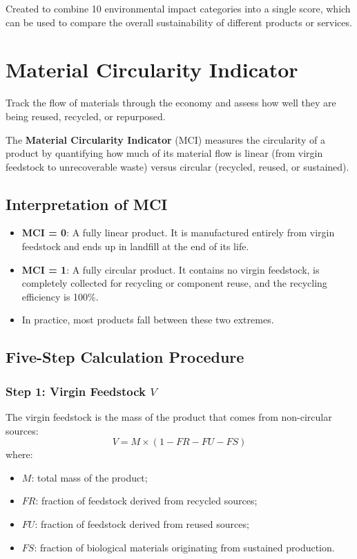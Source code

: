 \documentclass{NoteThesis/note-thesis}
\begin{document}
\begin{mynote_env}[frametitle={Okala Impact Factor}]
    Created to combine 10 environmental impact categories into a single score, which can be used to compare the overall sustainability of different products or services.
\end{mynote_env}

\section{Material Circularity Indicator}

Track the flow of materials through the economy and assess how well they are being reused, recycled, or repurposed.

The \textbf{Material Circularity Indicator} (MCI) measures the circularity of a product by quantifying how much of its material flow is linear (from virgin feedstock to unrecoverable waste) versus circular (recycled, reused, or sustained).

\subsection{Interpretation of MCI}

\begin{itemize}
    \item \textbf{MCI = 0}: A fully linear product.
    It is manufactured entirely from virgin feedstock and ends up in landfill at the end of its life.
    \item \textbf{MCI = 1}: A fully circular product.
    It contains no virgin feedstock, is completely collected for recycling or component reuse, and the recycling efficiency is 100\%.
    \item In practice, most products fall between these two extremes.
\end{itemize}

\subsection{Five-Step Calculation Procedure}

\subsubsection{Step 1: Virgin Feedstock $V$}

The virgin feedstock is the mass of the product that comes from non-circular sources:
\[
    V = M \times (1 - FR - FU - FS)
\]
where:
\begin{itemize}
    \item $M$: total mass of the product;
    \item $FR$: fraction of feedstock derived from recycled sources;
    \item $FU$: fraction of feedstock derived from reused sources;
    \item $FS$: fraction of biological materials originating from sustained production.
\end{itemize}
\end{document}
